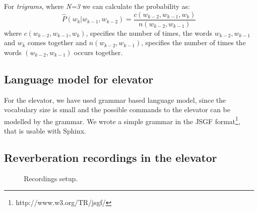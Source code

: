 \documentclass[a4paper, 12pt]{article}
\begin{document}
For \textit{trigrams}, where \textit{N=3} we can calculate the probability as:
\begin{equation}
  \hat{P}(w_k | w_{k-1},w_{k-2}) = \frac{c(w_{k-2},w_{k-1},w_k)}{n(w_{k-2},w_{k-1})} 
\end{equation}
where $c(w_{k-2},w_{k-1},w_k)$, specifies the number of times, the words $w_{k-2},w_{k-1}$ and $w_k$ comes together and $n(w_{k-2},w_{k-1})$, specifies the number of times the words $(w_{k-2},w_{k-1})$ occurs together. 

\subsection{Language model for elevator}
For the elevator, we have used grammar based language model, since the vocabulary size is small and the possible commands to the elevator can be modelled by the grammar. 
We wrote a simple grammar in the JSGF format\footnote{http://www.w3.org/TR/jsgf/}, that is usable with Sphinx.

\subsection{Reverberation recordings in the elevator}

\begin{figure}
\caption{Recordings setup.}
\label{fig:recordingsetup}
\end{figure}
\end{document}
